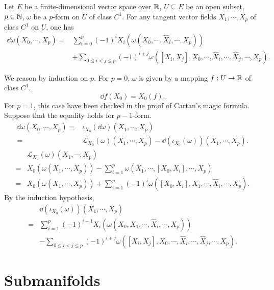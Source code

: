 \begin{theoremenv}\label{thm:7.3.15}
    Let $E$ be a finite-dimensional vector space over $\mathbb{R}$, $U \subseteq E$ be an open subset,
    $p \in \mathbb{N}$, $\omega$ be a $p$-form on $U$ of class $C^1$.
    For any tangent vector fields $X_1,\cdots,X_p$ of class $C^1$ on $U$, one has
    $$\begin{aligned}
        \dd \omega (X_0,\cdots,X_p) = & \sum_{i = 0}^{p} (-1)^{i} X_i (\omega(X_0,\cdots,\hat{X}_i,\cdots,X_p))\\
        & + \sum_{0 \le i < j \le p} (-1)^{i+j} \omega([X_i,X_j],X_0,\cdots,\hat{X}_i,\cdots,\hat{X}_j,\cdots,X_p).
    \end{aligned}$$
\end{theoremenv}
\begin{proofenv}
    We reason by induction on $p$.
    For $p=0$, $\omega$ is given by a mapping $f : U \rightarrow \mathbb{R}$ of class $C^1$.
    $$\dd f (X_0) = X_0(f).$$
    For $p=1$, this case have been checked in the proof of Cartan's magic formula.
    Suppose that the equality holds for $p-1$-form.
    $$\begin{aligned}
        \dd \omega (X_0,\cdots,X_p) = & \iota_{X_0} (\dd \omega) (X_1,\cdots,X_p)\\
        = & \mathcal{L}_{X_0} (\omega) (X_1,\cdots,X_p) - \dd (\iota_{X_0}(\omega))(X_1,\cdots,X_p).
    \end{aligned}$$
    $$\begin{aligned}
        & \mathcal{L}_{X_0} (\omega) (X_1,\cdots,X_p)\\
        = & X_0 (\omega(X_1,\cdots,X_p)) - \sum_{i=1}^{p} \omega(X_1,\cdots,[X_0,X_i],\cdots,X_p)\\
        = & X_0 (\omega(X_1,\cdots,X_p)) + \sum_{i=1}^{p} (-1)^{i} \omega ([X_0,X_i],X_1,\cdots,\hat{X}_i,\cdots,X_p).
    \end{aligned}$$
    By the induction hypothesis,
    $$\begin{aligned}
        & \dd (\iota_{X_0}(\omega))(X_1,\cdots,X_p)\\
        = & \sum_{i=1}^{p} (-1)^{i-1} X_i (\omega(X_0,X_1,\cdots,\hat{X}_i,\cdots,X_p))\\
        & - \sum_{0 \le i < j \le p} (-1)^{i+j} \omega([X_i,X_j],X_0,\cdots,\hat{X}_i,\cdots,\hat{X}_j,\cdots,X_p).
    \end{aligned}$$
\end{proofenv}


\section{Submanifolds}


